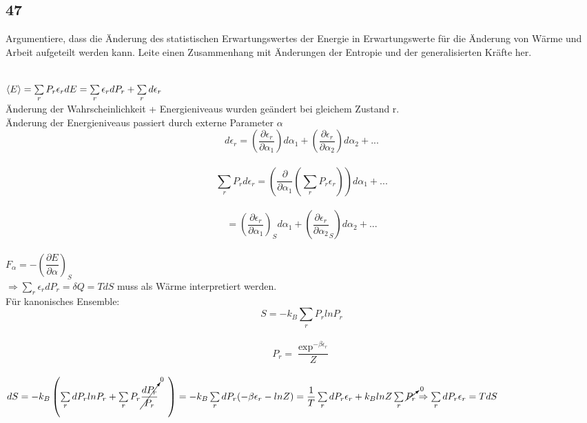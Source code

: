 \documentclass[12pt,a4paper]{report}
\newenvironment{myfrag}{\begin{it}}{\end{it}\vspace{3mm}\par}
\numberwithin{equation}{section}
\begin{document}
\subsection{47}
\begin{myfrag}
Argumentiere, dass die Änderung des statistischen Erwartungswertes der Energie
in Erwartungswerte für die Änderung von Wärme und Arbeit aufgeteilt werden
kann. Leite einen Zusammenhang mit Änderungen der Entropie und der
generalisierten Kräfte her.
\end{myfrag} \quad \\
$\left\langle E \right\rangle = \sum \limits _r P_r \epsilon _r \\[1.5ex]
dE = \sum \limits_r \epsilon _r dP_r + \sum \limits_r d\epsilon_r$ \\
Änderung der Wahrscheinlichkeit + Energieniveaus wurden geändert bei gleichem Zustand r. \\
Änderung der Energieniveaus passiert durch externe Parameter $\alpha $ \\[1.ex]
$$d \epsilon _r = \left( \dfrac{\partial \epsilon _r}{\partial \alpha _1} \right) d \alpha _1 + \left( \dfrac{\partial \epsilon _r}{\partial \alpha _2} \right) d \alpha _2 + ... $$\\$$
\sum \limits_r P_r d \epsilon _r = \left( \dfrac{\partial }{\partial \alpha _1}\left(\sum \limits_r P_r \epsilon _r \right)\right) d \alpha _1 + ...$$ \\$$
= \left( \dfrac{\partial \epsilon _r}{\partial \alpha _1} \right)_S d \alpha _1+ \left( \dfrac{\partial \epsilon _r}{\partial \alpha _2}_S \right) d \alpha _2 + ...$$
\\[1.5ex]
$F_\alpha = - \left(\dfrac{\partial E}{\partial\alpha} \right) _S $ \\[1.5ex]
$\Rightarrow \sum \limits_r \epsilon_r dP_r = \delta Q = TdS $ muss als Wärme interpretiert werden. \\[2ex]
Für kanonisches Ensemble:\\[1.5ex]
$$ S= -k_B \sum \limits _r P_r ln P_r $$
\\
$$P_r = \dfrac{ \exp ^{-\beta \epsilon _r}}{Z}$$ \\[1ex]
$dS = -k_B \left(  \sum \limits_r dP_r lnP_r + \sum \limits _r P_r  \cancelto{0}{ \dfrac{dP_r}{P_r}}\quad \right) \\[1ex]
= -k_B \sum \limits _r dP_r (-\beta \epsilon_r - lnZ)
\\[1ex]
=\dfrac{1}{T}\sum \limits _r dP_r \epsilon _r + k_B lnZ \sum \limits_r \cancelto{0}{P_r} 
\\[1.5ex]
\Rightarrow \sum \limits_r dP_r \epsilon _r = TdS$
\end{document}
